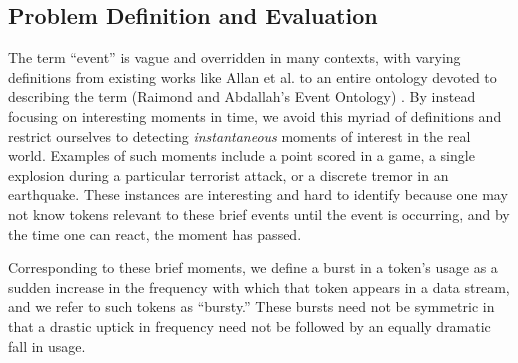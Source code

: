 \documentclass{sig-alternate}
\begin{document}
\subsection{Problem Definition and Evaluation}

%
The term ``event'' is vague and overridden in many contexts, with varying definitions from existing works like Allan et al. to an entire ontology devoted to describing the term (Raimond and Abdallah's Event Ontology) \cite{Raimond2007,allan1998line}.
By instead focusing on interesting moments in time, we avoid this myriad of definitions and restrict ourselves to detecting \emph{instantaneous} moments of interest in the real world.
Examples of such moments include a point scored in a game, a single explosion during a particular terrorist attack, or a discrete tremor in an earthquake.
These instances are interesting and hard to identify because one may not know tokens relevant to these brief events until the event is occurring, and by the time one can react, the moment has passed. 

Corresponding to these brief moments, we define a burst in a token's usage as a sudden increase in the frequency with which that token appears in a data stream, and we refer to such tokens as ``bursty.''
These bursts need not be symmetric in that a drastic uptick in frequency need not be followed by an equally dramatic fall in usage.
\end{document}
